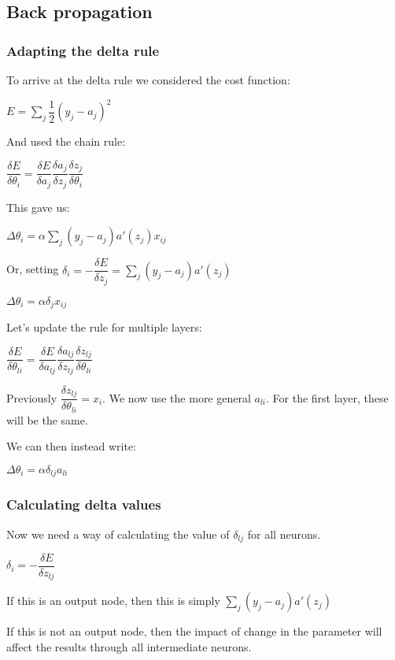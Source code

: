 
\subsection{Back propagation}

\subsubsection{Adapting the delta rule}

To arrive at the delta rule we considered the cost function:

\(E=\sum_j\dfrac{1}{2}(y_j-a_j)^2\)

And used the chain rule:

\(\dfrac{\delta E}{\delta \theta_i }=\dfrac{\delta E}{\delta a_j}\dfrac{\delta a_j}{\delta z_j}\dfrac{\delta z_j}{\delta \theta_i}\)

This gave us:

\(\Delta \theta_i=\alpha \sum_j(y_j-a_j)a'(z_j)x_{ij}\)

Or, setting \(\delta_i=-\dfrac{\delta E}{\delta z_j}=\sum_j(y_j-a_j)a'(z_j)\)

\(\Delta \theta_i=\alpha \delta_j x_{ij}\)

Let's update the rule for multiple layers:

\(\dfrac{\delta E}{\delta \theta_{li}}=\dfrac{\delta E}{\delta a_{lj}}\dfrac{\delta a_{lj}}{\delta z_{lj}}\dfrac{\delta z_{lj}}{\delta \theta_{li}}\)

Previously \(\dfrac{\delta z_{lj}}{\delta \theta_{li}}=x_i\). We now use the more general \(a_{li}\). For the first layer, these will be the same.

We can then instead write:

\(\Delta \theta_i=\alpha \delta_{lj} a_{li}\)

\subsubsection{Calculating delta values}

Now we need a way of calculating the value of \(\delta_{lj}\) for all neurons.

\(\delta_i=-\dfrac{\delta E}{\delta z_{lj}}\)

If this is an output node, then this is simply \(\sum_j(y_j-a_j)a'(z_j)\)

If this is not an output node, then the impact of change in the parameter will affect the results through all intermediate neurons.

